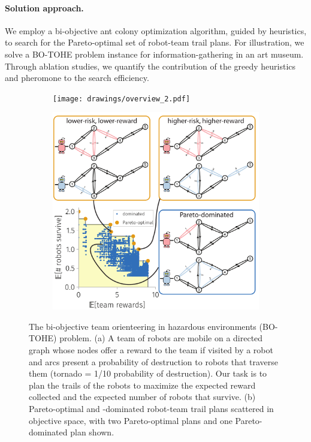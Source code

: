 \documentclass[11pt, oneside]{article}
\begin{document}
\paragraph{Solution approach.} 
We employ a bi-objective ant colony optimization algorithm, guided by heuristics, to search for the Pareto-optimal set of robot-team trail plans.
For illustration, we solve a BO-TOHE problem instance for information-gathering in an art museum.
Through ablation studies, we quantify the contribution of the greedy heuristics and pheromone to the search efficiency. 

\begin{figure}[h!]
    \centering
     \begin{subfigure}[b]{0.62\textwidth}
    	\texttt{[image: drawings/overview\_2.pdf]}
	\caption{} \label{fig:overview}
    \end{subfigure}
    \begin{subfigure}[b]{0.66\textwidth}
    	\includegraphics[width=\textwidth]{drawings/toy_pareto_front2.pdf}
	\caption{} \label{fig:pareto_optimal}
    \end{subfigure}
    \caption{
      The bi-objective team orienteering in hazardous environments (BO-TOHE) problem.
      (a) A team of robots are mobile on a directed graph whose 
      nodes offer a reward to the team if visited by a robot and 
      arcs present a probability of destruction to robots that traverse them (tornado = 1/10 probability of destruction). Our task is to plan the trails of the robots to maximize the expected reward collected and the expected number of robots that survive.
      (b) Pareto-optimal and -dominated robot-team trail plans scattered in objective space, with two Pareto-optimal plans and one Pareto-dominated plan shown.}
\end{figure}
\end{document}
